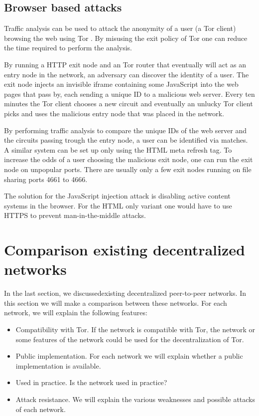 \documentclass[journal]{IEEEtran}
\begin{document}
		\subsection{Browser based attacks}
			Traffic analysis can be used to attack the anonymity of a user (a Tor client) browsing the web using Tor \cite{abbott2007browser}. By misusing the exit policy of Tor one can reduce the time required to perform the analysis.
		
			By running a HTTP exit node and an Tor router that eventually will act as an entry node in the network, an adversary can discover the identity of a user. The exit node injects an invisible iframe containing some JavaScript into the web pages that pass by, each sending a unique ID to a malicious web server. Every ten minutes the Tor client chooses a new circuit and eventually an unlucky Tor client picks and uses the malicious entry node that was placed in the network.
		
			By performing traffic analysis to compare the unique IDs of the web server and the circuits passing trough the entry node, a user can be identified via matches. A similar system can be set up only using the HTML meta refresh tag. To increase the odds of a user choosing the malicious exit node, one can run the exit node on unpopular ports. There are usually only a few exit nodes running on file sharing ports 4661 to 4666.
		
			The solution for the JavaScript injection attack is disabling active content systems in the browser. For the HTML only variant one would have to use HTTPS to prevent man-in-the-middle attacks.
	
	\section{Comparison existing decentralized networks}
		
		In the last section, we discussedexisting decentralized peer-to-peer networks. In this section we will make a comparison between these networks. For each network, we will explain the following features:
\begin{itemize}
\item Compatibility with Tor. If the network is compatible with Tor, the network or some features of the network could be used for the decentralization of Tor.
\item Public implementation. For each network we will explain whether a public implementation is available.
\item Used in practice. Is the network used in practice?
\item Attack resistance. We will explain the various weaknesses and possible attacks of each network.
\end{itemize}
	
\end{document}
